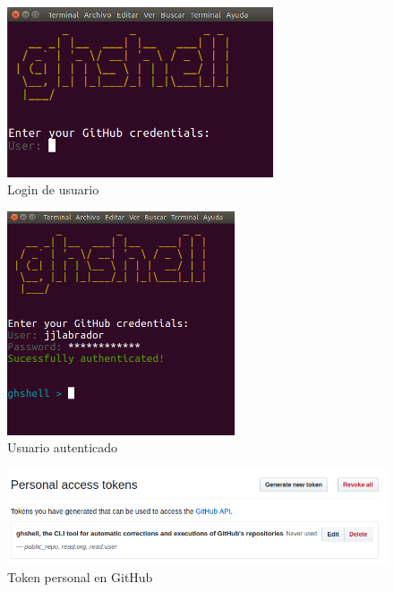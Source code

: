         \begin{figure}[H]
		\begin{center}
		\includegraphics[width=0.7\textwidth]{images/ghshell1}
		\caption{Login de usuario}
		\label{fig:ghshell1}
		\end{center}
		\end{figure}
		
		\begin{figure}[H]
		\begin{center}
		\includegraphics[width=0.6\textwidth]{images/ghshell2-1}
		\caption{Usuario autenticado}
		\label{fig:ghshell2-1}
		\end{center}
		\end{figure}
		
		\begin{figure}[H]
		\begin{center}
		\includegraphics[width=1\textwidth]{images/ghshell2-3}
		\caption{Token personal en GitHub}
		\label{fig:ghshell2-3}
		\end{center}
		\end{figure}
		
